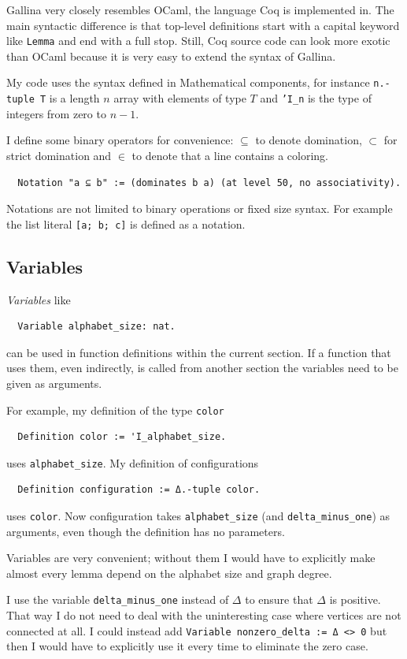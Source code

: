 \documentclass[english, 12pt, a4paper, sci, a-1b, online]{aaltothesis}
\newcommand\icoq[1]{\texttt{#1}}
\begin{document}
Gallina very closely resembles OCaml, the language Coq is implemented in. The main syntactic difference is that top-level definitions start with a capital keyword like \icoq{Lemma} and end with a full stop. Still, Coq source code can look more exotic than OCaml because it is very easy to extend the syntax of Gallina.

My code uses the syntax defined in Mathematical components, for instance \icoq{n.-tuple T} is a length $n$ array with elements of type $T$ and \icoq{'I_n} is the type of integers from zero to $n-1$.

I define some binary operators for convenience: $\subseteq$ to denote domination, $\subset$ for strict domination and $\in$ to denote that a line contains a coloring.
\begin{verbatim}
  Notation "a ⊆ b" := (dominates b a) (at level 50, no associativity).
\end{verbatim}

Notations are not limited to binary operations or fixed size syntax. For example the list literal \icoq{[a; b; c]} is defined as a notation.

\subsection{Variables}

\emph{Variables} like
\begin{verbatim}
  Variable alphabet_size: nat.
\end{verbatim}
can be used in function definitions within the current section. If a function that uses them, even indirectly, is called from another section the variables need to be given as arguments.

For example, my definition of the type \icoq{color}
\begin{verbatim}
  Definition color := 'I_alphabet_size.
\end{verbatim}
uses \icoq{alphabet_size}. My definition of configurations
\begin{verbatim}
  Definition configuration := Δ.-tuple color.
\end{verbatim}
uses \icoq{color}. Now configuration takes \icoq{alphabet_size} (and \icoq{delta_minus_one}) as arguments, even though the definition has no parameters.

Variables are very convenient; without them I would have to explicitly make almost every lemma depend on the alphabet size and graph degree.

I use the variable \icoq{delta_minus_one} instead of $\Delta$ to ensure that $\Delta$ is positive. That way I do not need to deal with the uninteresting case where vertices are not connected at all. I could instead add \icoq{Variable nonzero_delta := Δ <> 0} but then I would have to explicitly use it every time to eliminate the zero case.
\end{document}
